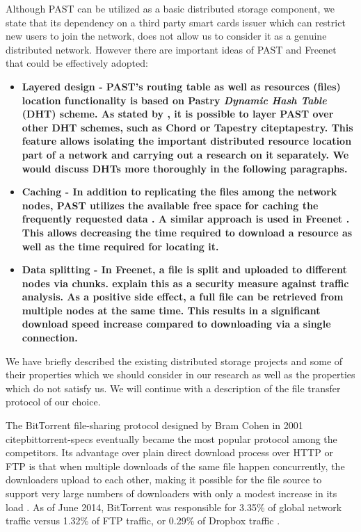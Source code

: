 Although PAST can be utilized as a basic distributed storage
component, we state that its dependency on a third party smart
cards issuer which can restrict new users to join the network,
does not allow us to consider it as a genuine distributed network.
However there are important ideas of PAST and Freenet that could be
effectively adopted:
\begin{itemize}
\item \bfseries{Layered design} - PAST's routing table as well
as resources (files) location functionality is based on Pastry
\citep{pastry} \emph{Dynamic Hash Table} (DHT) scheme. As stated by
\citet{past}, it is possible to layer PAST over other DHT schemes,
such as Chord \citep{chord-01} or Tapestry citep{tapestry}.
This feature allows isolating the important distributed resource
location part of a \pp network and carrying out a research on it
separately. We would discuss DHTs more thoroughly in the following
paragraphs.

\item \bfseries{Caching} - In addition to replicating the files among
the network nodes, PAST utilizes the available free space for caching
the frequently requested data \citep{past-caching}. A similar approach
is used in Freenet \citep{freenet}. This allows decreasing the time
required to download a resource as well as the time required for
locating it.

\item \bfseries{Data splitting} - In Freenet, a file is split and
uploaded to different nodes via chunks. \citet{dark-freenet} explain
this as a security measure against traffic analysis. As a positive
side effect, a full file can be retrieved from multiple nodes
at the same time. This results in a significant download speed
increase compared to downloading via a single connection.
\end{itemize}

We have briefly described the existing distributed storage projects
and some of their properties which we should consider in our research
as well as the properties which do not satisfy us. We will continue
with a description of the file transfer protocol of our choice.

The BitТorrent file-sharing protocol designed by Bram Cohen in 2001
citep{bittorrent-specs} eventually became the most popular protocol
among the competitors.
Its advantage over plain direct download process over HTTP or FTP
is that when multiple downloads of the same file happen concurrently,
the downloaders upload to each other, making it possible for the file
source to support very large numbers of downloaders with only a modest
increase in its load \citep{bittorrent-specs}.
As of June 2014, BitTorrent was responsible for 3.35\% of global
network traffic versus 1.32\% of FTP traffic, or 0.29\% of
Dropbox traffic \citep{paloalto-traffic}.

